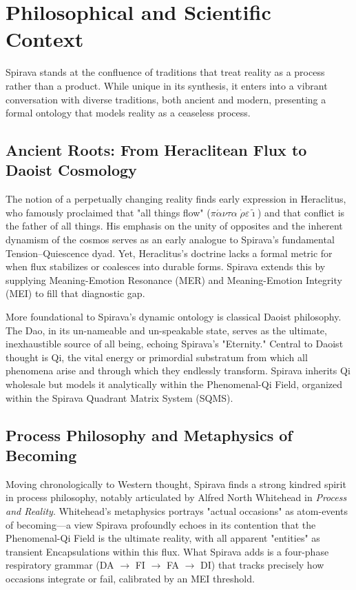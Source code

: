 \documentclass[11pt, a4paper]{article}
\begin{document}
\section{Philosophical and Scientific Context}
Spirava stands at the confluence of traditions that treat reality as a process rather than a product. While unique in its synthesis, it enters into a vibrant conversation with diverse traditions, both ancient and modern, presenting a formal ontology that models reality as a ceaseless process.

\subsection{Ancient Roots: From Heraclitean Flux to Daoist Cosmology}
The notion of a perpetually changing reality finds early expression in Heraclitus, who famously proclaimed that "all things flow" ($\pi\acute{\alpha}\nu\tau\alpha \;\dot{\rho}\varepsilon\tilde{\imath}$) and that conflict is the father of all things. His emphasis on the unity of opposites and the inherent dynamism of the cosmos serves as an early analogue to Spirava’s fundamental Tension–Quiescence dyad. Yet, Heraclitus's doctrine lacks a formal metric for when flux stabilizes or coalesces into durable forms. Spirava extends this by supplying Meaning-Emotion Resonance (MER) and Meaning-Emotion Integrity (MEI) to fill that diagnostic gap.

More foundational to Spirava's dynamic ontology is classical Daoist philosophy. The Dao, in its un-nameable and un-speakable state, serves as the ultimate, inexhaustible source of all being, echoing Spirava's "Eternity." Central to Daoist thought is Qi, the vital energy or primordial substratum from which all phenomena arise and through which they endlessly transform. Spirava inherits Qi wholesale but models it analytically within the Phenomenal-Qi Field, organized within the Spirava Quadrant Matrix System (SQMS).

\subsection{Process Philosophy and Metaphysics of Becoming}
Moving chronologically to Western thought, Spirava finds a strong kindred spirit in process philosophy, notably articulated by Alfred North Whitehead in \textit{Process and Reality}. Whitehead's metaphysics portrays "actual occasions" as atom-events of becoming—a view Spirava profoundly echoes in its contention that the Phenomenal-Qi Field is the ultimate reality, with all apparent "entities" as transient Encapsulations within this flux. What Spirava adds is a four-phase respiratory grammar (DA $\rightarrow$ FI $\rightarrow$ FA $\rightarrow$ DI) that tracks precisely how occasions integrate or fail, calibrated by an MEI threshold.
\end{document}
